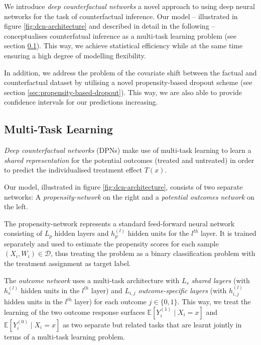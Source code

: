 We introduce \emph{deep counterfactual networks} a novel approach to using deep neural networks for the task of counterfactual inference. Our model -- illustrated in figure \ref{fig:dcn-architecture} and described in detail in the following -- conceptualises counterfatual inference as a multi-task learning problem (see section \ref{sec:multi-task-learning}). This way, we achieve  statistical efficiency while at the same time ensuring a high degree of modelling flexibility. 

In addition, we address the  problem of the covariate shift between the factual and counterfactual dataset by utilising a novel propensity-based dropout scheme (see section \ref{sec:propensity-based-dropout}). This way, we are also able to provide confidence intervals for our predictions increasing. 

\subsection{Multi-Task Learning} \label{sec:multi-task-learning}
\emph{Deep counterfactual networks} (DPNs) make use of multi-task learning to learn a \emph{shared representation} for the potential outcomes (treated and untreated) in order to predict the individualised treatment effect $T(x)$. 

Our model, illustrated in figure \ref{fig:dcn-architecture}, consists of two separate networks: A \emph{propensity-network} on the right and a \emph{potential outcomes network} on the left.

The propensity-network represents a standard feed-forward neural network consisting of $L_p$ hidden layers and $h_p^{(l)}$ hidden units for the $l^{th}$ layer. It is trained separately and used to estimate the propensity scores for each sample $(X_i, W_i) \in \mathcal{D}$, thus treating the problem as a binary classification problem with the treatment assignment as target label. 

The \emph{outcome network} uses a multi-task architecture %
with $L_s$ \emph{shared layers} (with $h_s^{(l)}$ hidden units in the $l^{th}$ layer) and $L_{i,j}$ \emph{outcome-specific layers} (with $h_{i,j}^{(l)}$ hidden units in the $l^{th}$ layer) for each outcome $j \in \{0,1\}$. This way, we treat the learning of the two outcome response surfaces $\mathbb{E}[Y_i^{(1)} \mid X_i = x]$ and $\mathbb{E}[Y_i^{(0)} \mid X_i = x]$ as two separate but related tasks that are learnt jointly in terms of a multi-task learning problem.


